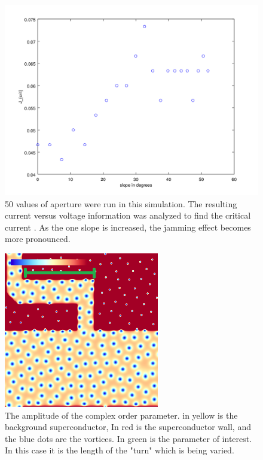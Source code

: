 \begin{figure}[htbp]
\begin{center}
\includegraphics[scale=.50]{oneside-angle-Scan.png}
\caption{ 50 values of aperture were run in this simulation. The resulting current versus voltage information was analyzed to find the critical current . As the one slope is increased, the jamming effect becomes more pronounced. }
\label{normalYscan}
\end{center}
\end{figure}

\begin{figure}[htbp]
\begin{center}
\includegraphics[scale=.50]{oneKinkDone.png}
\caption{ The amplitude of the complex order parameter. in yellow is the background superconductor, In red is the superconductor wall, and the blue dots are the vortices. In green is the parameter of interest. In this case it is the length of the "turn" which is being varied.}
\label{oneSidedY}
\end{center}
\end{figure}


